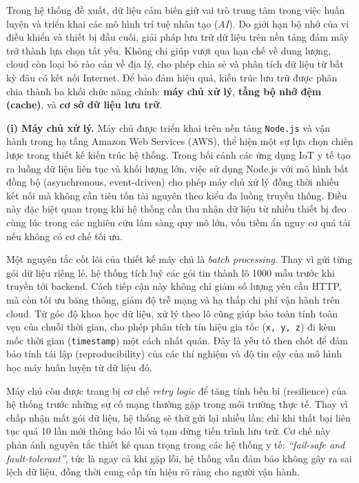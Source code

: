 Trong hệ thống đề xuất, dữ liệu cảm biến giữ vai trò trung tâm trong việc huấn luyện và triển khai 
các mô hình trí tuệ nhân tạo (\textit{AI}). Do giới hạn bộ nhớ của vi điều khiển và thiết bị đầu cuối, 
giải pháp lưu trữ dữ liệu trên nền tảng đám mây trở thành lựa chọn tất yếu. 
Không chỉ giúp vượt qua hạn chế về dung lượng, cloud còn loại bỏ rào cản về địa lý, 
cho phép chia sẻ và phân tích dữ liệu từ bất kỳ đâu có kết nối Internet. 
Để bảo đảm hiệu quả, kiến trúc lưu trữ được phân chia thành ba khối chức năng chính: 
\textbf{máy chủ xử lý}, \textbf{tầng bộ nhớ đệm (cache)}, và \textbf{cơ sở dữ liệu lưu trữ}.

\textbf{(i) Máy chủ xử lý.} 
Máy chủ được triển khai trên nền tảng \texttt{Node.js} và vận hành trong hạ tầng 
Amazon Web Services (AWS), thể hiện một sự lựa chọn chiến lược trong thiết kế kiến trúc hệ thống. 
Trong bối cảnh các ứng dụng IoT y tế tạo ra luồng dữ liệu liên tục và khối lượng lớn, 
việc sử dụng Node.js với mô hình bất đồng bộ (asynchronous, event-driven) cho phép máy chủ xử lý đồng thời 
nhiều kết nối mà không cần tiêu tốn tài nguyên theo kiểu đa luồng truyền thống. 
Điều này đặc biệt quan trọng khi hệ thống cần thu nhận dữ liệu từ nhiều thiết bị đeo cùng lúc 
trong các nghiên cứu lâm sàng quy mô lớn, vốn tiềm ẩn nguy cơ quá tải nếu không có cơ chế tối ưu.

Một nguyên tắc cốt lõi của thiết kế máy chủ là \textit{batch processing}. 
Thay vì gửi từng gói dữ liệu riêng lẻ, hệ thống tích luỹ các gói tin thành lô 1000 mẫu 
trước khi truyền tới backend. Cách tiếp cận này không chỉ giảm số lượng yêu cầu HTTP, 
mà còn tối ưu băng thông, giảm độ trễ mạng và hạ thấp chi phí vận hành trên cloud. 
Từ góc độ khoa học dữ liệu, xử lý theo lô cũng giúp bảo toàn tính toàn vẹn của chuỗi thời gian, 
cho phép phân tích tín hiệu gia tốc (\texttt{x, y, z}) đi kèm mốc thời gian (\texttt{timestamp}) 
một cách nhất quán. Đây là yếu tố then chốt để đảm bảo tính tái lập (reproducibility) 
của các thí nghiệm và độ tin cậy của mô hình học máy huấn luyện từ dữ liệu đó.

Máy chủ còn được trang bị cơ chế \textit{retry logic} để tăng tính bền bỉ (resilience) 
của hệ thống trước những sự cố mạng thường gặp trong môi trường thực tế. 
Thay vì chấp nhận mất gói dữ liệu, hệ thống sẽ thử gửi lại nhiều lần; 
chỉ khi thất bại liên tục quá 10 lần mới thông báo lỗi và tạm dừng tiến trình lưu trữ. 
Cơ chế này phản ánh nguyên tắc thiết kế quan trọng trong các hệ thống y tế: 
\textit{“fail-safe and fault-tolerant”}, tức là ngay cả khi gặp lỗi, hệ thống vẫn đảm bảo 
không gây ra sai lệch dữ liệu, đồng thời cung cấp tín hiệu rõ ràng cho người vận hành.

